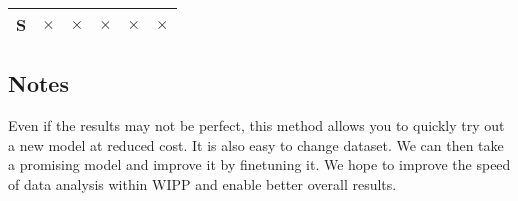 \begin{table}[H]
\begin{tabular}{lccccc}
  S & $\times$                                                         & $\times$                                                        & $\times$                                              & $\times$                                                        & $\times$ \\
  \bottomrule
\end{tabular}
\end{table}




\subsection{Notes}

Even if the results may not be perfect, this method allows you to quickly try
out a new model at reduced cost. It is also easy to change dataset. We can then
take a promising model and improve it by finetuning it. We hope to improve the
speed of data analysis within \Gls{WIPP} and enable better overall results.
